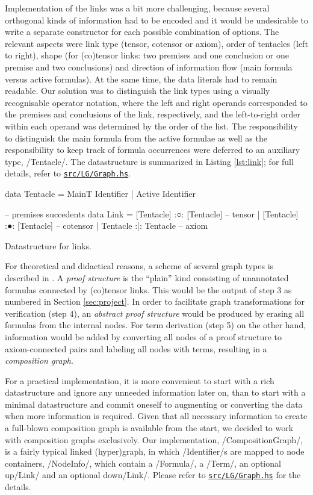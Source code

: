 \documentclass[12pt,a4paper]{article}
\newcommand{\coderef}[1]{\href{https://github.com/jgonggrijp/net-prove/blob/report/#1}{\texttt{#1}}}
\begin{document}
Implementation of the links was a bit more challenging, because several orthogonal kinds of information had to be encoded and it would be undesirable to write a separate constructor for each possible combination of options. The relevant aspects were link type (tensor, cotensor or axiom), order of tentacles (left to right), shape (for (co)tensor links: two premises and one conclusion or one premise and two conclusions) and direction of information flow (main formula versus active formulas). At the same time, the data literals had to remain readable. Our solution was to distinguish the link types using a visually recognisable operator notation, where the left and right operands corresponded to the premises and conclusions of the link, respectively, and the left-to-right order within each operand was determined by the order of the list. The responsibility to distinguish the main formula from the active formulae as well as the responsibility to keep track of formula occurrences were deferred to an auxiliary type, \hs/Tentacle/. The datastructure is summarized in Listing \ref{lst:link}; for full details, refer to \coderef{src/LG/Graph.hs}.

\begin{listing}
    \begin{haskellcode}
        data Tentacle = MainT Identifier | Active Identifier
        
        --           premises      succedents
        data Link = [Tentacle] :○: [Tentacle]  -- tensor
                  | [Tentacle] :●: [Tentacle]  -- cotensor
                  |  Tentacle  :|:  Tentacle   -- axiom
    \end{haskellcode}
    \caption{Datastructure for links.}
    \label{lst:link}
\end{listing}

For theoretical and didactical reasons, a scheme of several graph types is described in \cite{mm12}. A \emph{proof structure} is the ``plain'' kind consisting of unannotated formulas connected by (co)tensor links. This would be the output of step 3 as numbered in Section \ref{sec:project}. In order to facilitate graph transformations for verification (step 4), an \emph{abstract proof structure} would be produced by erasing all formulas from the internal nodes. For term derivation (step 5) on the other hand, information would be added by converting all nodes of a proof structure to axiom-connected pairs and labeling all nodes with terms, resulting in a \emph{composition graph}.

For a practical implementation, it is more convenient to start with a rich datastructure and ignore any unneeded information later on, than to start with a minimal datastructure and commit oneself to augmenting or converting the data when more information is required. Given that all necessary information to create a full-blown composition graph is available from the start, we decided to work with composition graphs exclusively. Our implementation, \hs/CompositionGraph/, is a fairly typical linked (hyper)graph, in which \hs/Identifier/s are mapped to node containers, \hs/NodeInfo/, which contain a \hs/Formula/, a \hs/Term/, an optional up\hs/Link/ and an optional down\hs/Link/. Please refer to \coderef{src/LG/Graph.hs} for the details.
\end{document}
